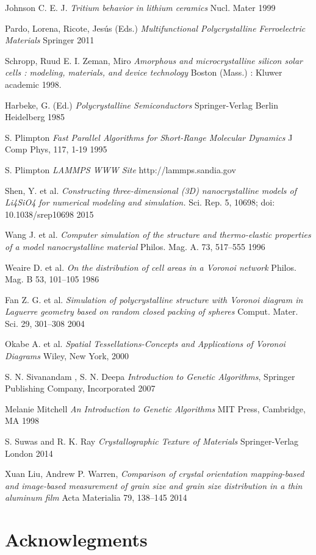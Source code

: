 \documentclass{article}
\begin{document}
\begin{thebibliography}{9}

  Johnson C. E. J.
  \textit{Tritium behavior in lithium ceramics}
  Nucl. Mater
  1999

  Pardo, Lorena, Ricote, Jesús (Eds.)
  \textit{Multifunctional Polycrystalline Ferroelectric Materials}
  Springer
  2011

  Schropp, Ruud E. I. Zeman, Miro
  \textit{Amorphous and microcrystalline silicon solar cells : modeling, materials, and device technology}
  Boston (Mass.) : Kluwer academic
  1998.

   Harbeke, G. (Ed.)
  \textit{Polycrystalline Semiconductors}
  Springer-Verlag Berlin Heidelberg
  1985

   S. Plimpton 
  \textit{Fast Parallel Algorithms for Short-Range Molecular Dynamics}
  J Comp Phys, 117, 1-19
  1995

   S. Plimpton 
  \textit{LAMMPS WWW Site}
  http://lammps.sandia.gov

  Shen, Y. et al. 
  \textit{Constructing three-dimensional (3D) nanocrystalline models of Li4SiO4 for numerical modeling and simulation.}
  Sci. Rep. 5, 10698; doi: 10.1038/srep10698 
  2015

  Wang J. et al. 
  \textit{Computer simulation of the structure and thermo-elastic properties of a model nanocrystalline material}
  Philos. Mag. A. 73, 517–555 
  1996

  Weaire D. et al. 
  \textit{On the distribution of cell areas in a Voronoi network}
  Philos. Mag. B 53, 101–105 
  1986

  Fan Z. G. et al. 
  \textit{Simulation of polycrystalline structure with Voronoi diagram in Laguerre geometry    based on random closed packing of spheres} 
  Comput. Mater. Sci. 29, 301–308 
  2004

Okabe A. et al. 
\textit{Spatial Tessellations-Concepts and Applications of Voronoi Diagrams}
Wiley, New York, 
2000

  S. N. Sivanandam , S. N. Deepa
  \textit{Introduction to Genetic Algorithms},
  Springer Publishing Company, Incorporated
  2007

  Melanie Mitchell
  \textit{An Introduction to Genetic Algorithms}
  MIT Press, Cambridge, MA
 1998

  S. Suwas and R. K. Ray
  \textit{Crystallographic Texture of Materials}
  Springer-Verlag London 
  2014

  Xuan Liu, Andrew P. Warren,
  \textit{Comparison of crystal orientation mapping-based and image-based measurement of grain size and grain size distribution in a thin aluminum film}
  Acta Materialia 79, 138–145
  2014

\end{thebibliography}


\section{Acknowlegments}
\end{document}
